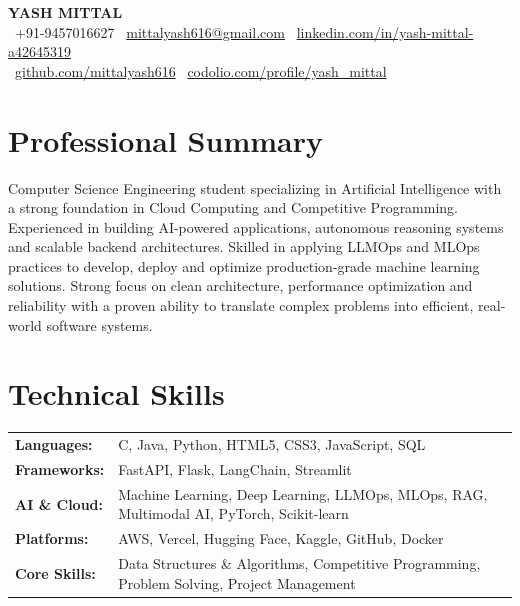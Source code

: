 \documentclass[9.5pt,letterpaper]{article}
\begin{document}

\begin{center}
  {\LARGE\bfseries YASH MITTAL}\\[4pt]
  \small
 ~+91-9457016627\enspace\textbar\enspace
  \faEnvelope~\href{mailto:mittalyash616@gmail.com}{mittalyash616@gmail.com}\enspace\textbar\enspace
  \faLinkedin~\href{https://linkedin.com/in/yash-mittal-a42645319}{linkedin.com/in/yash-mittal-a42645319}\\[3pt]
  \faGithub~\href{https://github.com/mittalyash616}{github.com/mittalyash616}\enspace\textbar\enspace
  \faCode~\href{https://codolio.com/profile/yash_mittal}{codolio.com/profile/yash\_mittal}
\end{center}
\vspace{-8pt}

\section{Professional Summary}

\small
Computer Science Engineering student specializing in Artificial Intelligence with a strong foundation in Cloud Computing and Competitive Programming. Experienced in building AI-powered applications, autonomous reasoning systems and scalable backend architectures. Skilled in applying LLMOps and MLOps practices to develop, deploy and optimize production-grade machine learning solutions. Strong focus on clean architecture, performance optimization and reliability with a proven ability to translate complex problems into efficient, real-world software systems.

\vspace{2pt}
\section{Technical Skills}
\small
\begin{tabularx}{\linewidth}{@{} >{\bfseries}l X @{}}
  Languages:           & C\raisebox{0.3ex}{\fontsize{5}{5}\selectfont ++}, Java, Python, HTML5, CSS3, JavaScript, SQL \\
  Frameworks:          & FastAPI, Flask, LangChain, Streamlit  \\
  AI \& Cloud:         & Machine Learning, Deep Learning, LLMOps, MLOps, RAG, Multimodal AI, PyTorch, Scikit-learn \\
  Platforms:     & AWS, Vercel, Hugging Face, Kaggle, GitHub, Docker \\
  Core Skills:   & Data Structures \& Algorithms, Competitive Programming, Problem Solving, Project Management \\
\end{tabularx}
\end{document}
